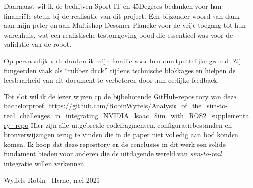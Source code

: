 Daarnaast wil ik de bedrijven Sport-IT en 45Degrees bedanken voor hun financiële steun bij de realisatie van dit project. Een bijzonder woord van dank aan mijn peter en aan Multishop Desomer Plancke voor de vrije toegang tot hun warenhuis, wat een realistische testomgeving bood die essentieel was voor de validatie van de robot.

Op persoonlijk vlak danken ik mijn familie voor hun onuitputtelijke geduld. Zij fungeerden vaak als ``rubber duck'' tijdens technische blokkages en hielpen de leesbaarheid van dit document te verbeteren door hun eerlijke feedback.

Tot slot wil ik de lezer wijzen op de bijbehorende GitHub-repository van deze bachelorproef. \url{https://github.com/RobinWyffels/Analysis_of_the_sim-to-real_challenges_in_integrating_NVIDIA_Isaac_Sim_with_ROS2_supplementary_repo}
 Hier zijn alle uitgebreide codefragmenten, configuratiebestanden en bronverwijzingen terug te vinden die in de paper niet volledig aan bod konden komen. Ik hoop dat deze repository en de conclusies in dit werk een solide fundament bieden voor anderen die de uitdagende wereld van \textit{sim-to-real} integratie willen verkennen.

\vspace{1cm}

\noindent Wyffels Robin \
Herne, mei 2026